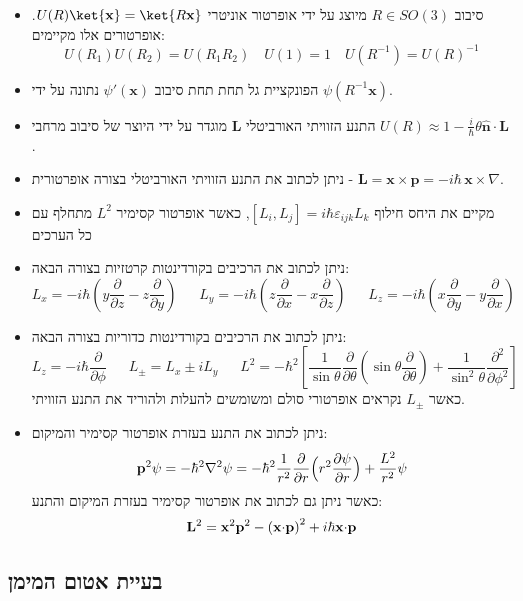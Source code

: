 \documentclass{tstextbook}
\begin{document}
\begin{summary}
  \begin{itemize}
    \item סיבוב \(R \in SO(3)\) מיוצג על ידי אופרטור אוניטרי \(U(R)\ket{\mathbf{x}}=\ket{R\mathbf{x}}\). אופרטורים אלו מקיימים:
$$U(R_{1})U(R_{2})=U(R_{1}R_{2})\quad U(1)=1\quad U(R^{-1})=U(R)^{-1}$$
    \item הפונקציית גל תחת תחת סיבוב \(\psi'\left( \mathbf{x} \right)\) נתונה על ידי \(\psi\left( R^{-1}\mathbf{x} \right)\).
    \item התנע הזוויתי האורביטלי \(\mathbf{L}\) מוגדר על ידי היוצר של סיבוב מרחבי \(U(R)\approx1-{\frac{i}{\hbar}}\theta\mathbf{\hat{n}}\cdot\mathbf{L}\).
    \item ניתן לכתוב את התנע הזוויתי האורביטלי בצורה אופרטורית - \(\mathbf{L}=\mathbf{x}\times\mathbf{p}=-i\hbar\,\mathbf{x}\times\nabla\).
    \item מקיים את היחס חילוף \([L_{i},L_{j}]=i\hbar\varepsilon_{i j k}L_{k}\), כאשר אופרטור קסימיר \(L^{2}\) מתחלף עם כל הערכים
    \item ניתן לכתוב את הרכיבים בקורדינטות קרטזיות בצורה הבאה:
$${{L_{x}=-i\hbar\left(y\frac{\partial}{\partial z}-z\frac{\partial}{\partial y}\right)}}\quad \;\; {{L_{y}=-i\hbar\left(z\frac{\partial}{\partial x}-x\frac{\partial}{\partial z}\right)}}\;\;\quad  {{L_{z}=-i\hbar\left(x\frac{\partial}{\partial y}-y\frac{\partial}{\partial x}\right)}}$$
    \item ניתן לכתוב את הרכיבים בקורדינטות כדוריות בצורה הבאה:
$$L_{z}=-i\hbar\frac{\partial}{\partial\phi}\;\;\quad L_{\pm}=L_{x}\pm i L_{y}\;\;\quad L^{2}=-\hbar^{2}\left[\frac{1}{\sin\theta}\frac{\partial}{\partial\theta}\left(\sin\theta\frac{\partial}{\partial\theta}\right)+\frac{1}{\sin^{2}\theta}\frac{\partial^{2}}{\partial\phi^{2}}\right]$$
כאשר \(L_{\pm}\) נקראים אופרטורי סולם ומשומשים להעלות ולהוריד את התנע הזוויתי.
    \item ניתן לכתוב את התנע בעזרת אופרטור קסימיר והמיקום:
$${\bf p}^{2}\psi=-\hbar^{2}\nabla^{2}\psi=-\hbar^{2}\frac{1}{r^{2}}\frac{\partial}{\partial r}\Big(r^{2}\frac{\partial\psi}{\partial r}\Big)+\frac{L^{2}}{r^{2}}\psi$$
כאשר ניתן גם לכתוב את אופרטור קסימיר בעזרת המיקום והתנע:
$${\bf L}^{2}={\bf x}^{2}{\bf p}^{2}-\left({\bf x}{\cdot}{\bf p}\right)^{2}+i\hbar{\bf x}{\cdot}{\bf p}$$
  \end{itemize}
\end{summary}
\subsection{בעיית אטום המימן}
\end{document}
